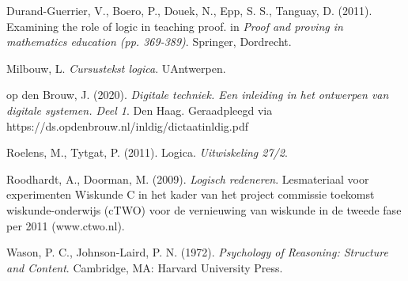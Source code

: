 \begin{bronnen}
\item Durand-Guerrier, V., Boero, P., Douek, N., Epp, S. S., Tanguay, D. (2011). Examining the role of logic in teaching proof. in \emph{Proof and proving in mathematics education (pp. 369-389)}. Springer, Dordrecht.
\item Milbouw, L. \textit{Cursustekst logica}. UAntwerpen.
\item op den Brouw, J. (2020). \textit{Digitale techniek. Een inleiding in het ontwerpen van digitale systemen. Deel 1}. Den Haag. Geraadpleegd via  https://ds.opdenbrouw.nl/inldig/dictaat\textunderscore inldig.pdf
\item Roelens, M., Tytgat, P. (2011). Logica. \emph{Uitwiskeling 27/2}.
\item Roodhardt, A., Doorman, M. (2009). \textit{Logisch redeneren}. Lesmateriaal voor experimenten Wiskunde C in het kader van het project commissie toekomst wiskunde-onderwijs (cTWO) voor de vernieuwing van wiskunde in de tweede fase per 2011 (www.ctwo.nl).
\item Wason, P. C., Johnson-Laird, P. N. (1972). \emph{Psychology of Reasoning: Structure and Content}. Cambridge, MA: Harvard University Press.


\end{bronnen}
